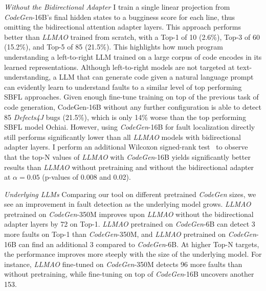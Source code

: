 \documentclass[12pt,openany,oneside,table]{cmuthesis}
\begin{document}
    \vspace{0.5ex}
    \emph{Without the Bidirectional Adapter} I train a single linear projection from \textit{CodeGen}-16B's final hidden states to a bugginess score for each line, thus omitting the bidirectional attention adapter layers. This approach performs better than \textit{LLMAO} trained from scratch, with a Top-1 of 10 (2.6\%), Top-3 of 60 (15.2\%), and Top-5 of 85 (21.5\%). This highlights how much program understanding a left-to-right LLM trained on a large corpus of code encodes in its learned representations. Although left-to-right models are not targeted at text-understanding, a LLM that can generate code given a natural language prompt can evidently learn to understand faults to a similar level of top performing SBFL approaches. Given enough fine-tune training on top of the previous task of code generation, CodeGen-16B without any further configuration is able to detect 85 \textit{Defects4J} bugs (21.5\%), which is only 14\% worse than the top performing SBFL model Ochiai. However, using \textit{CodeGen}-16B for fault localization directly still performs significantly lower than all \textit{LLMAO} models with bidirectional adapter layers.
    I perform an additional Wilcoxon signed-rank test~\cite{woolson2007wilcoxon} to observe that the top-N values of \textit{LLMAO} with \textit{CodeGen}-16B yields significantly better results than \textit{LLMAO} without pretraining and without the bidirectional adapter at $\alpha=0.05$ (p-values of 0.008 and 0.02).
    
    \vspace{0.5ex}
    \emph{Underlying LLMs}
    Comparing our tool on different pretrained \textit{CodeGen} sizes, we see an improvement in fault detection as the underlying model grows.
    \textit{LLMAO} pretrained on \textit{CodeGen}-350M improves upon \textit{LLMAO} without the bidirectional adapter layers by 72 on Top-1. \textit{LLMAO} pretrained on \textit{CodeGen}-6B can detect 3 more faults on Top-1 than \textit{CodeGen}-350M, and \textit{LLMAO} pretrained on \textit{CodeGen}-16B can find an additional 3 compared to \textit{CodeGen}-6B.
    At higher Top-N targets, the performance improves more steeply with the size of the underlying model. For instance, \textit{LLMAO} fine-tuned on \textit{CodeGen}-350M detects 96 more faults than without pretraining, while fine-tuning on top of \textit{CodeGen}-16B uncovers another 153.
    
\end{document}
